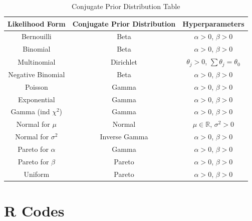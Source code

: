 \documentclass[lecture,12pt,]{pcms-l}
\numberwithin{section}{chapter}
\numberwithin{equation}{chapter}
\theoremstyle{plain}
\theoremstyle{definition}
\theoremstyle{definition}
\begin{document}
\begin{table}[h]
\caption{Conjugate Prior Distribution Table}
 \begin{tabular}{||c c c ||} 
 \hline
 Likelihood Form & Conjugate Prior Distribution & Hyperparameters  \\ [0.5ex]
 \hline\hline
 Bernouilli & Beta & $\alpha>0$, $\beta>0$ \\ 
 Binomial & Beta & $\alpha>0$, $\beta>0$   \\ 
 Multinomial & Dirichlet & $\theta_j>0$, $\sum \theta_j=\theta_0$  \\ 
 Negative Binomial & Beta & $\alpha>0$, $\beta>0$  \\ 
 Poisson & Gamma & $\alpha>0$, $\beta>0$  \\
 Exponential & Gamma & $\alpha>0$, $\beta>0$  \\
 Gamma (ind $\chi^2$) & Gamma & $\alpha>0$, $\beta>0$  \\
 Normal for $\mu$ & Normal & $\mu \in \mathbb{R}$, $\sigma^2>0$  \\
  Normal for $\sigma^2$ & Inverse Gamma & $\alpha>0$, $\beta>0$  \\
   Pareto for $\alpha$ & Gamma & $\alpha>0$, $\beta>0$  \\
    Pareto for $\beta$ & Pareto &$\alpha>0$, $\beta>0$  \\
 Uniform & Pareto & $\alpha>0$, $\beta>0$ \\ [1ex] 
 \hline
\end{tabular}
\end{table}

\appendix

\chapter*{R Codes}








\end{document}
